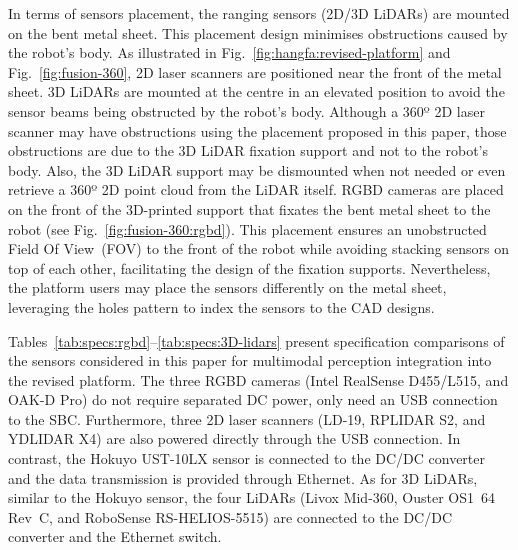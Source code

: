 \documentclass[letterpaper,10pt,conference]{IEEEtran} %
\def\figref#1{Fig.~\ref{#1}}
\begin{document}
In terms of sensors placement,
the ranging sensors (2D/3D LiDARs) are mounted on the bent metal sheet.
This placement design minimises obstructions
caused by the robot's body. As illustrated in
\figref{fig:hangfa:revised-platform} and \figref{fig:fusion-360},
2D laser scanners are positioned near the front of the metal sheet.
3D LiDARs are mounted at the centre in an elevated position
to avoid the sensor beams being obstructed by the robot's body.
Although a 360º 2D laser scanner may have obstructions
using the placement proposed in this paper,
those obstructions are due to the 3D LiDAR fixation support
and not to the robot's body.
Also, the 3D LiDAR support may be dismounted when not needed
or even retrieve a 360º 2D point cloud from the LiDAR itself.
RGBD cameras are placed on the front of the 3D-printed support
that fixates the bent metal sheet to the robot
(see \figref{fig:fusion-360:rgbd}).
This placement ensures an unobstructed Field Of View~(FOV)
to the front of the robot while avoiding stacking sensors on top of each other,
facilitating the design of the fixation supports. Nevertheless,
the platform users may place the sensors differently
on the metal sheet, leveraging the holes pattern to
index the sensors to the CAD designs.

Tables~\ref{tab:specs:rgbd}--\ref{tab:specs:3D-lidars}
present specification comparisons of
the sensors considered in this paper
for multimodal perception integration into the revised platform.
The three RGBD cameras (Intel RealSense D455/L515, and OAK-D Pro)
do not require separated DC power, only need an USB connection to the SBC.
Furthermore, three 2D laser scanners (LD-19, RPLIDAR S2, and YDLIDAR X4)
are also powered directly through the USB connection.
In contrast, the Hokuyo UST-10LX sensor
is connected to the DC/DC converter
and the data transmission is provided through Ethernet.
As for 3D LiDARs, similar to the Hokuyo sensor, the four LiDARs
(Livox Mid-360, Ouster OS1~64 Rev~C, and RoboSense RS-HELIOS-5515)
are connected to the DC/DC converter and the Ethernet switch.
\end{document}
